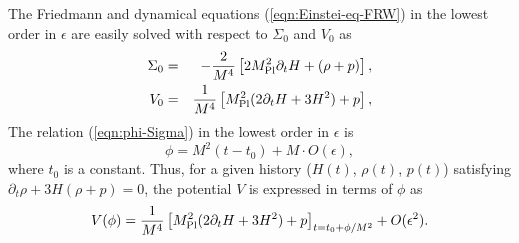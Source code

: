 The Friedmann and dynamical equations (\ref{eqn:Einstei-eq-FRW}) in the
lowest order in $\epsilon$ are easily solved with respect to $\Sigma_0$
and $V_0$ as 
%
\begin{eqnarray}
 \Sigma_0 & = & -\frac{2}{M^4}
  \left[2M_{\rm Pl}^2\partial_tH+(\rho+p)\right],
  \nonumber\\
 V_0 & = & \frac{1}{M^4}
  \left[M_{\rm Pl}^2(2\partial_tH+3H^2)+p\right],
  \label{eqn:sol-Sigma0-V0}
\end{eqnarray}
The relation (\ref{eqn:phi-Sigma}) in the lowest order in $\epsilon$ is 
%
\begin{equation}
 \phi = M^2 (t-t_0) + M\cdot O(\epsilon), 
\end{equation}
where $t_0$ is a constant. Thus, for a given history ($H(t)$, $\rho(t)$,
$p(t)$) satisfying $\partial_t\rho+3H(\rho+p)=0$, the potential $V$ is
expressed in terms of $\phi$ as  
%
\begin{equation}
 V(\phi) = 
  \frac{1}{M^4}\left[M_{\rm Pl}^2(2\partial_tH+3H^2)+p\right]_{t=t_0+\phi/M^2}
  +O(\epsilon^2).
  \label{eqn:V-phi-leading}
\end{equation}



